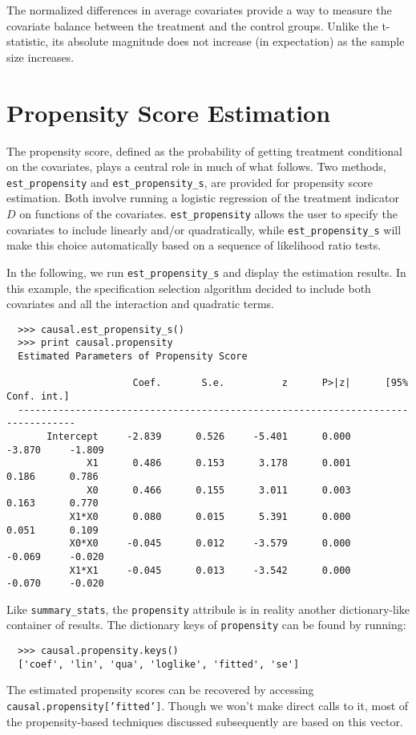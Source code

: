 \documentclass[12pt]{article}
\theoremstyle{definition}
\theoremstyle{definition}
\theoremstyle{definition}
\theoremstyle{remark}
\begin{document}
The normalized differences in average covariates provide a way to measure the covariate balance between the treatment and the control groups. Unlike the t-statistic, its absolute magnitude does not increase (in expectation) as the sample size increases.

\section{Propensity Score Estimation} \label{sec.c}

The propensity score, defined as the probability of getting treatment conditional on the covariates, plays a central role in much of what follows. Two methods, \texttt{est\_propensity} and \texttt{est\_propensity\_s}, are provided for propensity score estimation. Both involve running a logistic regression of the treatment indicator $D$ on functions of the covariates. \texttt{est\_propensity} allows the user to specify the covariates to include linearly and/or quadratically, while \texttt{est\_propensity\_s} will make this choice automatically based on a sequence of likelihood ratio tests.

In the following, we run \texttt{est\_propensity\_s} and display the estimation results. In this example, the specification selection algorithm decided to include both covariates and all the interaction and quadratic terms.

\begin{verbatim}
  >>> causal.est_propensity_s()
  >>> print causal.propensity
  Estimated Parameters of Propensity Score
  
                      Coef.       S.e.          z      P>|z|      [95% Conf. int.]
  --------------------------------------------------------------------------------
       Intercept     -2.839      0.526     -5.401      0.000     -3.870     -1.809
              X1      0.486      0.153      3.178      0.001      0.186      0.786
              X0      0.466      0.155      3.011      0.003      0.163      0.770
           X1*X0      0.080      0.015      5.391      0.000      0.051      0.109
           X0*X0     -0.045      0.012     -3.579      0.000     -0.069     -0.020
           X1*X1     -0.045      0.013     -3.542      0.000     -0.070     -0.020
\end{verbatim}

Like \texttt{summary\_stats}, the \texttt{propensity} attribule is in reality another dictionary-like container of results. The dictionary keys of \texttt{propensity} can be found by running:
\begin{verbatim}
  >>> causal.propensity.keys()
  ['coef', 'lin', 'qua', 'loglike', 'fitted', 'se']
\end{verbatim}
The estimated propensity scores can be recovered by accessing \texttt{causal.propensity['fitted']}. Though we won't make direct calls to it, most of the propensity-based techniques discussed subsequently are based on this vector.
\end{document}
